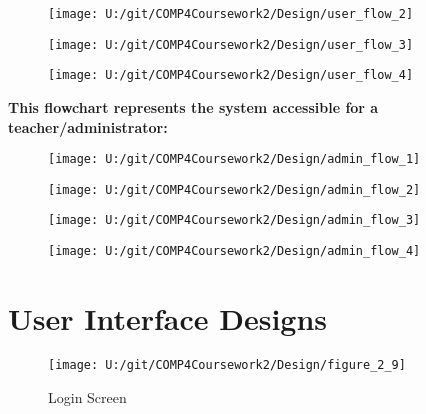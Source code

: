 \begin{figure}[H]
    \texttt{[image: U:/git/COMP4Coursework2/Design/user\_flow\_2]}
    \label{fig:print_function_result}\caption{}
\end{figure}

\begin{figure}[H]
    \texttt{[image: U:/git/COMP4Coursework2/Design/user\_flow\_3]}
    \label{fig:print_function_result}\caption{}
\end{figure}

\begin{figure}[H]
    \texttt{[image: U:/git/COMP4Coursework2/Design/user\_flow\_4]}
    \label{fig:print_function_result}\caption{}
\end{figure}

\textbf{This flowchart represents the system accessible for a teacher/administrator: }

\begin{figure}[H]
    \texttt{[image: U:/git/COMP4Coursework2/Design/admin\_flow\_1]}
    \label{fig:print_function_result}\caption{}
\end{figure}

\begin{figure}[H]
    \texttt{[image: U:/git/COMP4Coursework2/Design/admin\_flow\_2]}
    \label{fig:print_function_result}\caption{}
\end{figure}

\begin{figure}[H]
    \texttt{[image: U:/git/COMP4Coursework2/Design/admin\_flow\_3]}
    \label{fig:print_function_result}\caption{}
\end{figure}

\begin{figure}[H]
    \texttt{[image: U:/git/COMP4Coursework2/Design/admin\_flow\_4]}
    \label{fig:print_function_result}\caption{}
\end{figure}

\section{User Interface Designs}


\begin{figure}[H]
    \label{fig:print_function_result}\caption{Login Screen}
    \texttt{[image: U:/git/COMP4Coursework2/Design/figure\_2\_9]}
\end{figure}

